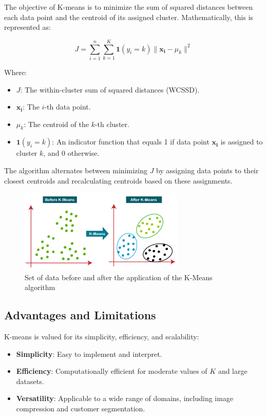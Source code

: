 The objective of K-means is to minimize the sum of squared distances between each data point and the centroid of its assigned cluster. Mathematically, this is represented as:

\[
J = \sum_{i=1}^{n} \sum_{k=1}^{K} \mathbf{1}(y_i = k) \|\mathbf{x_i} - \mu_k\|^2
\]

Where:
\begin{itemize}
    \item \( J \): The within-cluster sum of squared distances (WCSSD).
    \item \( \mathbf{x_i} \): The \( i \)-th data point.
    \item \( \mu_k \): The centroid of the \( k \)-th cluster.
    \item \( \mathbf{1}(y_i = k) \): An indicator function that equals 1 if data point \( \mathbf{x_i} \) is assigned to cluster \( k \), and 0 otherwise.
\end{itemize}

The algorithm alternates between minimizing \( J \) by assigning data points to their closest centroids and recalculating centroids based on these assignments.

\begin{figure}[H]
    \centering
    \includegraphics[width=0.7\textwidth]{images/kmeans.png}
    \caption{Set of data before and after the application of the K-Means algorithm}
    \label{fig:k_means}
\end{figure}


\subsection{Advantages and Limitations}
K-means is valued for its simplicity, efficiency, and scalability:
\begin{itemize}
    \item \textbf{Simplicity}: Easy to implement and interpret.
    \item \textbf{Efficiency}: Computationally efficient for moderate values of \( K \) and large datasets.
    \item \textbf{Versatility}: Applicable to a wide range of domains, including image compression and customer segmentation.
\end{itemize}


